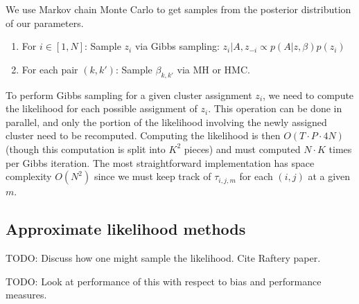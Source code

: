 \documentclass[11pt]{article}
\begin{document}
We use Markov chain Monte Carlo to get samples from the posterior distribution of our parameters.  

\begin{enumerate}
\item For $i \in [1,N]$: Sample $z_i$ via Gibbs sampling: 
$z_i | A, z_{-i} \propto p(A|z,\beta) p(z_i)$
\item For each pair $(k,k')$: Sample $\beta_{k,k'}$ via MH or HMC.
\end{enumerate}

To perform Gibbs sampling for a given cluster assignment $z_i$, we need to compute the likelihood for each possible assignment of $z_i$. 
This operation can be done in parallel, and only the portion of the likelihood involving the newly assigned cluster  need to be recomputed.  Computing the likelihood is then $O(T \cdot P \cdot 4N)$ (though this computation is split into $K^2$ pieces) and must computed $N \cdot K$ times per Gibbs iteration.  The most straightforward implementation has space complexity $O(N^2)$ since we must keep track of $\tau_{i,j,m}$ for each $(i,j)$ at a given $m$.

\subsection{Approximate likelihood methods}

TODO: Discuss how one might sample the likelihood.  Cite Raftery paper.

TODO: Look at performance of this with respect to bias and performance measures.




\end{document}
